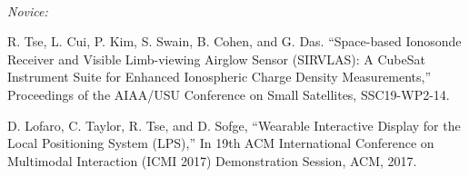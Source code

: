 \documentclass[10pt,a4paper,ragged2e,withhyper]{altacv}
\begin{document}
\begin{paracol}{2}
\vspace{0.125cm}

          \cvtag{\LaTeX} \\

\divider

\textit{Novice:}

\vspace{0.125cm}

   

\vspace{0.25cm}

\renewcommand\refname{\vskip -1cm}


\vspace{-0.25cm}

\begin{thebibliography}{2}
R. Tse, L. Cui, P. Kim, S. Swain, B. Cohen, and G. Das. “Space-based Ionosonde Receiver and Visible Limb-viewing Airglow Sensor (SIRVLAS): A CubeSat Instrument Suite for Enhanced Ionospheric Charge Density Measurements,” Proceedings of the AIAA/USU Conference on Small Satellites, SSC19-WP2-14.

D. Lofaro, C. Taylor, R. Tse, and D. Sofge, “Wearable Interactive Display for the Local Positioning System (LPS),” In 19th ACM International Conference on Multimodal Interaction (ICMI 2017) Demonstration Session, ACM, 2017.

\end{thebibliography}

\end{paracol}
\end{document}
